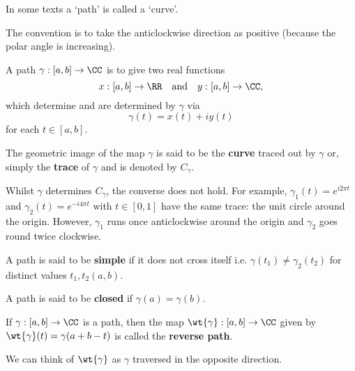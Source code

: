 \documentclass[12pt, a4paper]{article}
\begin{document}
\begin{mdremark}
    In some texts a `path' is called a `curve'.
\end{mdremark}

\begin{theorem}
    The convention is to take the anticlockwise direction as positive (because the polar angle is increasing).
\end{theorem}

\begin{mdthm}
    A path \(\gamma :[a,b] \to \CC\) is to give two real functions 
    \[x :[a,b] \to \RR \quad \text{and} \quad y:[a,b] \to \CC,\]
    which determine and are determined by \(\gamma\) via
    \[\gamma(t) = x(t)+iy(t)\]
    for each \(t \in [a,b]\).
\end{mdthm}

\begin{definition}
    The geometric image of the map \(\gamma\) is said to be the \textbf{curve} traced out by \(\gamma\) or, simply the \textbf{trace} of \(\gamma\) and is denoted by \(C_{\gamma}\).
\end{definition}

\begin{mdremark}
    Whilst \(\gamma\) determines \(C_{\gamma}\), the converse does not hold. For example, \(\gamma_1(t) = e^{i2\pi t}\) and \(\gamma_2(t) = e^{-i4\pi t}\) with \(t \in [0,1]\) have the same trace: the unit circle around the origin. However, \(\gamma_1\) runs once anticlockwise around the origin and \(\gamma_2\) goes round twice clockwise.
\end{mdremark}

\begin{definition}
    A path is said to be \textbf{simple} if it does not cross itself i.e. \(\gamma(t_1) \neq \gamma_2(t_2)\) for distinct values \(t_1,t_2 (a,b)\).
\end{definition}

\begin{definition}
    A path is said to be \textbf{closed} if \(\gamma(a)=\gamma(b)\).
\end{definition}

\begin{definition}
    If \(\gamma:[a,b] \to \CC\) is a path, then the map \(\wt{\gamma} : [a,b] \to \CC\) given by \(\wt{\gamma}(t)=\gamma(a+b-t)\) is called the \textbf{reverse path}. 
\end{definition}

\begin{mdnote}
    We can think of \(\wt{\gamma}\) as \(\gamma\) traversed in the opposite direction.
\end{mdnote}
\end{document}
